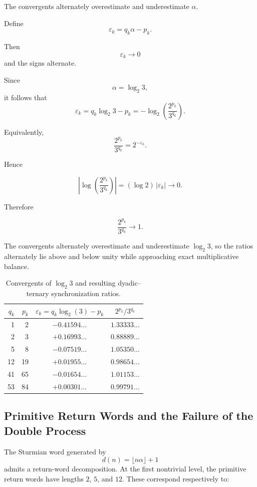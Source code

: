 \documentclass[12pt, oneside]{article}
\numberwithin{equation}{section}
\theoremstyle{definition}
\theoremstyle{plain}
\theoremstyle{remark}
\begin{document}
The convergents alternately overestimate and underestimate $\alpha$.

Define
\[
\varepsilon_k = q_k\alpha-p_k.
\]

Then
\[
\varepsilon_k \to 0
\]
and the signs alternate.

Since
\[
\alpha=\log_2 3,
\]
it follows that
\[
\varepsilon_k = q_k\log_2 3-p_k = -\log_2\!\left(\frac{2^{p_k}}{3^{q_k}}\right).
\]

Equivalently,
\[
\frac{2^{p_k}}{3^{q_k}} = 2^{-\varepsilon_k}.
\]

Hence

\[
\left|
\log\!\left(
\frac{2^{p_k}}{3^{q_k}}
\right)
\right|
=
(\log 2)\,|\varepsilon_k|
\to0.
\]

Therefore

\[
\frac{2^{p_k}}{3^{q_k}}
\to1.
\]

The convergents alternately overestimate and underestimate
$\log_2 3$, so the ratios alternately lie above and below unity while
approaching exact multiplicative balance.

\begin{table}[ht]
\centering
\caption{Convergents of $\log_2 3$ and resulting
dyadic--ternary synchronization ratios.}
\label{tab:tower-ratios}
\begin{tabular}{r r c c}
\hline
$q_k$ & $p_k$ &
$\varepsilon_k=q_k\log_2(3)-p_k$ &
$\displaystyle 2^{p_k} / 3^{q_k}$ \\
\hline
 1 &  2 & $-0.41594\ldots$ & $1.33333\ldots$ \\
 2 &  3 & $+0.16993\ldots$ & $0.88889\ldots$ \\
 5 &  8 & $-0.07519\ldots$ & $1.05350\ldots$ \\
12 & 19 & $+0.01955\ldots$ & $0.98654\ldots$ \\
41 & 65 & $-0.01654\ldots$ & $1.01153\ldots$ \\
53 & 84 & $+0.00301\ldots$ & $0.99791\ldots$ \\
\hline
\end{tabular}
\end{table}

\subsection{Primitive Return Words and the Failure of the Double Process}

The Sturmian word generated by
\[
d(n)=\lfloor n\alpha\rfloor+1
\]
admits a return-word decomposition.  At the first nontrivial level, the primitive
return words have lengths $2$, $5$, and $12$. These correspond respectively to:
\end{document}
